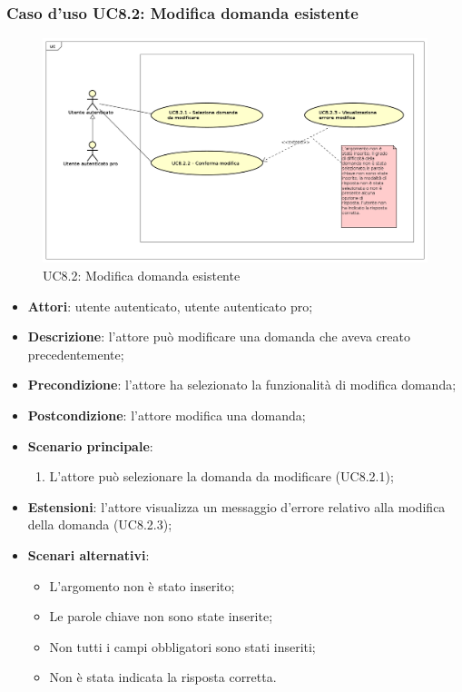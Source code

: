 	\subsubsection{Caso d'uso UC8.2: Modifica domanda esistente}
	\label{UC8.2}
	\begin{figure}[h]
		\centering
			\includegraphics[scale=0.45,keepaspectratio]{UML/UC8_2.png}
		\caption{UC8.2: Modifica domanda esistente}
	\end{figure}
	\FloatBarrier
	\begin{itemize}
		\item
			\textbf{Attori}: utente autenticato, utente autenticato pro;
		\item		
			\textbf{Descrizione}: l'attore può modificare una domanda che aveva creato precedentemente;
		\item
			\textbf{Precondizione}: l'attore ha selezionato la funzionalità di modifica domanda;
		\item
			\textbf{Postcondizione}: l'attore modifica una domanda;
		\item
			\textbf{Scenario principale}:
				\begin{enumerate}
					\item
						L'attore può selezionare la domanda da modificare (UC8.2.1);
				\end{enumerate}
	       		
	 	\item
			\textbf{Estensioni}: l'attore visualizza un messaggio d'errore relativo alla modifica della domanda (UC8.2.3);
	 	\item
	 		\textbf{Scenari alternativi}:
				\begin{itemize}
					\item 	
						L'argomento non è stato inserito;
					\item
						Le parole chiave non sono state inserite;
					\item
						Non tutti i campi obbligatori sono stati inseriti; 
					\item
						Non è stata indicata la risposta corretta.	
				\end{itemize}
	\end{itemize}
	
